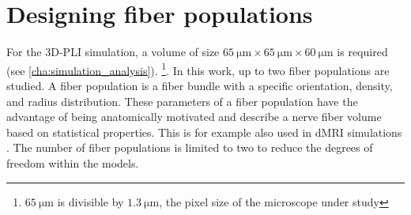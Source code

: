\section{Designing fiber populations}
%
For the \ac{3D-PLI} simulation, a volume of size $\SI{65}{\micro\meter} \times \SI{65}{\micro\meter} \times \SI{60}{\micro\meter}$ is required (see \cref{cha:simulation_analysis}). \footnote{$\SI{65}{\micro\meter}$ is divisible by $\SI{1.3}{\micro\meter}$, the pixel size of the microscope under study}.
In this work, up to two fiber populations are studied.
A fiber population is a fiber bundle with a specific orientation, density, and radius distribution.
These parameters of a fiber population have the advantage of being anatomically motivated and describe a nerve fiber volume based on statistical properties.
This is for example also used in \ac{dMRI} simulations \cite{Ginsburger2018,Ginsburger2019,ginsburgerDis2019}.
The number of fiber populations is limited to two to reduce the degrees of freedom within the models.
%
% 
% 
